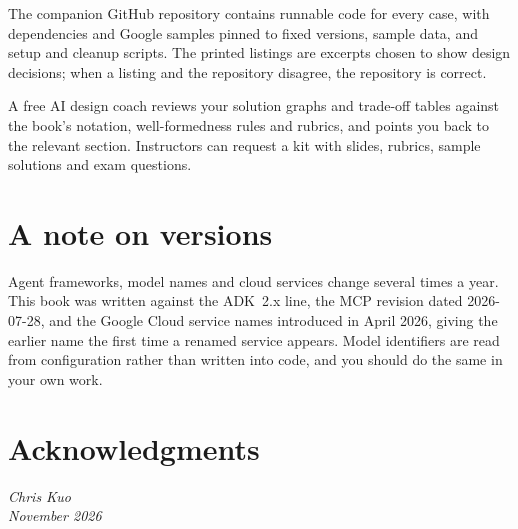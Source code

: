 The companion GitHub repository contains runnable code for every case, with dependencies and Google samples pinned to fixed versions, sample data, and setup and cleanup scripts. The printed listings are excerpts chosen to show design decisions; when a listing and the repository disagree, the repository is correct.

A free AI design coach reviews your solution graphs and trade-off tables against the book's notation, well-formedness rules and rubrics, and points you back to the relevant section. Instructors can request a kit with slides, rubrics, sample solutions and exam questions.

\section*{A note on versions}

Agent frameworks, model names and cloud services change several times a year. This book was written against the ADK~2.x line, the MCP revision dated 2026-07-28, and the Google Cloud service names introduced in April 2026, giving the earlier name the first time a renamed service appears. Model identifiers are read from configuration rather than written into code, and you should do the same in your own work.

\section*{Acknowledgments}


\bigskip
\noindent\textit{Chris Kuo}\\
\textit{November 2026}
